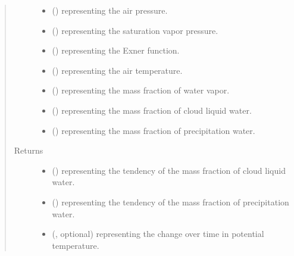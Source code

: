 \documentclass[letterpaper,10pt,english]{sphinxmanual}
\begin{document}
\begin{fulllineitems}
\begin{fulllineitems}
\begin{quote}
\begin{description}
\begin{itemize}
\item {} 
 () \textendash{}  representing the air pressure.

\item {} 
 () \textendash{}  representing the saturation vapor pressure.

\item {} 
 () \textendash{}  representing the Exner function.

\item {} 
 () \textendash{}  representing the air temperature.

\item {} 
 () \textendash{}  representing the mass fraction of water vapor.

\item {} 
 () \textendash{}  representing the mass fraction of cloud liquid water.

\item {} 
 () \textendash{}  representing the mass fraction of precipitation water.

\end{itemize}

\item[{Returns}] \leavevmode
\begin{itemize}
\item {} 
 () \textendash{}  representing the tendency of the mass fraction of cloud liquid water.

\item {} 
 () \textendash{}  representing the tendency of the mass fraction of precipitation water.

\item {} 
 (, optional) \textendash{}  representing the change over time in potential temperature.


\end{itemize}
\end{description}
\end{quote}
\end{fulllineitems}
\end{fulllineitems}
\end{document}

